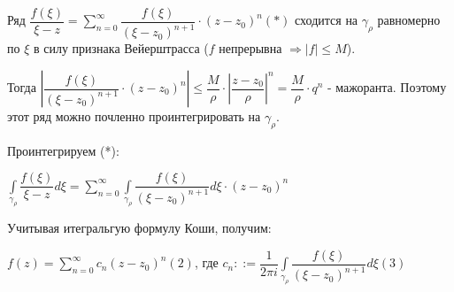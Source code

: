 \documentclass[a4paper, 12pt]{report}
\begin{document}
Ряд $\dfrac{f(\xi)}{\xi - z} = \sum\limits_{n=0}^{\infty}\dfrac{f(\xi)}{(\xi - z_0)^{n+1}}\cdot(z - z_0)^n (*)$ сходится на $\gamma_{\rho}$ равномерно по $\xi$ в силу признака Вейерштрасса ($f$ непрерывна $\Rightarrow |f| \leq M$).

Тогда $|\dfrac{f(\xi)}{(\xi - z_0)^{n+1}}\cdot(z - z_0)^{n}| \leq \dfrac{M}{\rho}\cdot|\dfrac{z - z_0}{\rho}|^n = \dfrac{M}{\rho}\cdot q^n$ - мажоранта. Поэтому этот ряд можно почленно проинтегрировать на $\gamma_{\rho}$.
\par\bigskip
Проинтегрируем (*):

\begin{center}
    $\int\limits_{\gamma_{\rho}}\dfrac{f(\xi)}{\xi - z}d\xi = \sum\limits_{n=0}^{\infty}\int\limits_{\gamma_{\rho}}\dfrac{f(\xi)}{(\xi - z_0)^{n+1}}d\xi\cdot(z - z_0)^n$
\end{center}

Учитывая итегральгую формулу Коши, получим:

\begin{center}
    $f(z) = \sum\limits_{n=0}^{\infty} c_n(z - z_0)^n (2)$, где $c_n ::= \dfrac{1}{2\pi i}\int\limits_{\gamma_{\rho}}\dfrac{f(\xi)}{(\xi - z_0)^{n+1}}d\xi (3)$
\end{center}
\end{document}
